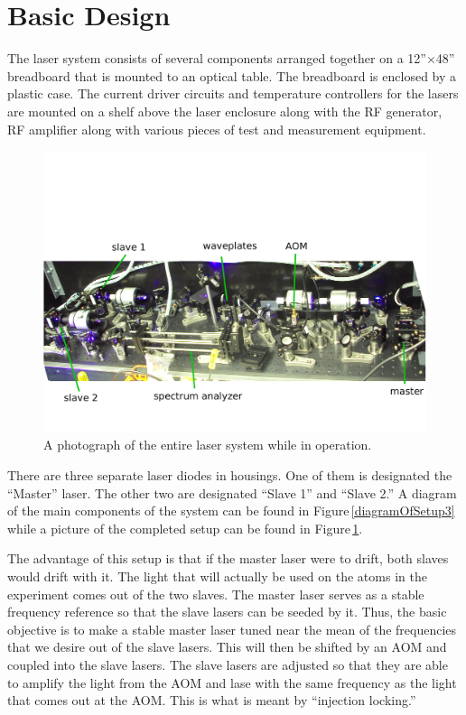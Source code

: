 \section{Basic Design}
The laser system consists of several components arranged together on a 12''$\times$48'' breadboard that is mounted to an optical table. The breadboard is enclosed by a plastic case. The current driver circuits and temperature controllers for the lasers are mounted on a shelf above the laser enclosure along with the RF generator, RF amplifier along with various pieces of test and measurement equipment.  
\begin{figure}
    \centerline{\includegraphics[width=1\textwidth]{entire_setup}}
    \caption[Photo of Entire System]{\label{fullexperimentphoto}
A photograph of the entire laser system while in operation. 
    }
\end{figure}

There are three separate laser diodes in housings. One of them is designated the ``Master'' laser. The other two are designated ``Slave 1'' and ``Slave 2.'' 
 A diagram of the main components of the system can be found in Figure\,\ref{diagramOfSetup3} while a picture of the completed setup can be found in Figure\,\ref{fullexperimentphoto}. 

The advantage of this setup is that if the master laser were to drift, both slaves would drift with it. The light that will actually be used on the atoms in the experiment comes out of the two slaves. The master laser serves as a stable frequency reference so that the slave lasers can be seeded by it. Thus, the basic objective is to make a stable master laser tuned near the mean of the frequencies that we desire out of the slave lasers. This will then be shifted by an AOM and coupled into the slave lasers. The slave lasers are adjusted so that they are able to amplify the light from the AOM and lase with the same frequency as the light that comes out at the AOM. This is what is meant by ``injection locking.''

